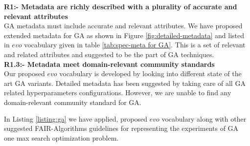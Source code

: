 \documentclass[preprint,12pt]{elsarticle}
\begin{document}
\textbf{R1:- Metadata are richly described with a plurality of accurate and relevant attributes}\\
GA metadata must include accurate and relevant attributes. We have proposed extended metadata for GA as shown in Figure \ref{fig:detailed-metadata} and listed in $evo$ vocabulary given in table \ref{tab:spec-meta for GA}. This is a set of relevant and related attributes and suggested to be the part of GA techniques.\\


\textbf{R1.3:- Metadata meet domain-relevant community standards}\\
Our proposed $evo$ vocabulary is developed by looking into different state of the art GA variants. Detailed metadata has been suggested by taking care of all GA related hyperparameters configurations. However, we are unable to find any domain-relevant community standard for GA. 

In Listing \ref{listing:ga} we have applied, proposed $evo$ vocabulary along with other suggested FAIR-Algorithms guidelines for representing the experiments of GA one max search optimization problem.
\end{document}
